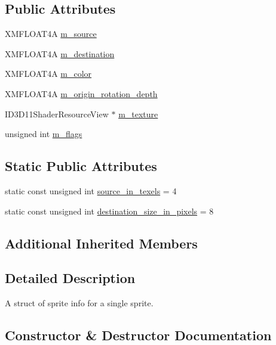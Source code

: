 \subsection*{Public Attributes}
\begin{DoxyCompactItemize}
\item 
X\+M\+F\+L\+O\+A\+T4A \hyperlink{structmage_1_1_sprite_info_a15e373b0b7edf90e512a4a0f665c810f}{m\+\_\+source}
\item 
X\+M\+F\+L\+O\+A\+T4A \hyperlink{structmage_1_1_sprite_info_a40a00e6cf76fc333309d706f064deed8}{m\+\_\+destination}
\item 
X\+M\+F\+L\+O\+A\+T4A \hyperlink{structmage_1_1_sprite_info_ab76316069522fc10f9580b705406ed16}{m\+\_\+color}
\item 
X\+M\+F\+L\+O\+A\+T4A \hyperlink{structmage_1_1_sprite_info_ae8026876747e7b5924d6940551895ccd}{m\+\_\+origin\+\_\+rotation\+\_\+depth}
\item 
I\+D3\+D11\+Shader\+Resource\+View $\ast$ \hyperlink{structmage_1_1_sprite_info_aea9963f991406a050bc5759fb05cfd5e}{m\+\_\+texture}
\item 
unsigned int \hyperlink{structmage_1_1_sprite_info_a1143e535cb1880ab9d931ab5b2dfcd5e}{m\+\_\+flags}
\end{DoxyCompactItemize}
\subsection*{Static Public Attributes}
\begin{DoxyCompactItemize}
\item 
static const unsigned int \hyperlink{structmage_1_1_sprite_info_a737c785bc6e9391f159ac4a5656316f7}{source\+\_\+in\+\_\+texels} = 4
\item 
static const unsigned int \hyperlink{structmage_1_1_sprite_info_a68b91ee8a489cd605aa208b6a1e54d62}{destination\+\_\+size\+\_\+in\+\_\+pixels} = 8
\end{DoxyCompactItemize}
\subsection*{Additional Inherited Members}


\subsection{Detailed Description}
A struct of sprite info for a single sprite. 

\subsection{Constructor \& Destructor Documentation}
\hypertarget{structmage_1_1_sprite_info_a95544c5b70d30b273a482139c4299be0}{}\label{structmage_1_1_sprite_info_a95544c5b70d30b273a482139c4299be0} 
